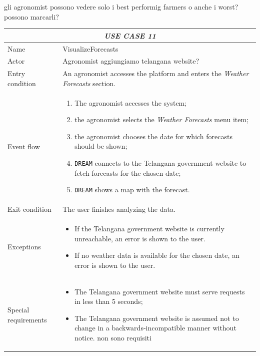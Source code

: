 \documentclass{article}
\begin{document}
\color{red} gli agronomist possono vedere solo i best performig farmers o anche i worst? possono marcarli? \color{black}

\centering
\begin{longtable}{|p{3.5cm}|m{8cm}|}
 \hline
 \multicolumn{2}{|c|}{\cellcolor{white}\emph{USE CASE 11}} \\
 \endfirsthead
 \endhead
 \endfoot
 \endlastfoot
 \hline
 Name & VisualizeForecasts\\
 \hline
 Actor & Agronomist \color{red} aggiungiamo telangana website? \color{black}\\
 \hline
 Entry condition & An agronomist accesses the platform and enters the \emph{Weather Forecasts} section.\\
 \hline
 Event flow & \begin{enumerate}
    \item The agronomist accesses the system;
    \item the agronomist selects the \emph{Weather Forecasts} menu item;
    \item the agronomist chooses the date for which forecasts should be shown;
    \item \verb|DREAM| connects to the Telangana government website to fetch forecasts for the chosen date;
    \item \verb|DREAM| shows a map with the forecast.
 \end{enumerate}\\
 \hline
 Exit condition & \color{red} The user finishes analyzing the data. \color{black}\\
 \hline
 Exceptions & \begin{itemize}
     \item If the Telangana government website is currently unreachable, an error is shown to the user.
     \item If no weather data is available for the chosen date, an error is shown to the user.
 \end{itemize}\\
 \hline
 Special requirements &\begin{itemize}
     \item The Telangana government website must serve requests in less than 5 seconds;
     \item The Telangana government website is assumed not to change in a backwards-incompatible manner without notice.
     \color{red} non sono requisiti \color{black}
 \end{itemize}\\
 \hline
\end{longtable}
\end{document}
